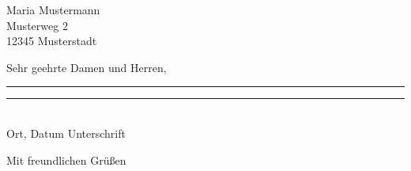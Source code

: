 \documentclass[DIN,parskip=half,fontsize=11pt,fromalign=right,fromrule=afteraddress,ngerman,enlargefirstpage=true]{scrlttr2}
\date{\usekomavar{fromplace}, \getthreefromjobname.\gettwofromjobname.\getonefromjobname}
\begin{document}
\begin{letter}{Maria Mustermann \\ Musterweg 2 \\ 12345 Musterstadt}
\opening{Sehr geehrte Damen und Herren,} 
 
\blindtext[5]
 
\vspace*{3cm}
\rule{5cm}{1pt} \hfill \rule{5cm}{1pt} \\
Ort, Datum \hfill Unterschrift\vspace*{3cm}

 
\closing{Mit freundlichen Grüßen}

\end{letter}
\end{document}
